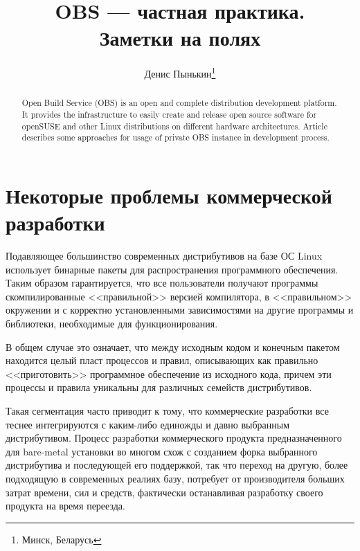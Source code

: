 \documentclass[10pt, a5paper]{article}
\begin{document}
\title{OBS --- частная практика.\\Заметки на полях}

\author{Денис Пынькин\footnote{Минск, Беларусь}}
\maketitle

\begin{abstract}
Open Build Service (OBS) is an open and complete distribution development platform. It provides the infrastructure to easily create and release open source software for openSUSE and other Linux distributions on different hardware architectures. Article describes some approaches for usage of private OBS instance in development process.
\end{abstract}

\section*{Некоторые проблемы коммерческой разработки}

Подавляющее большинство современных дистрибутивов на базе ОС Linux использует бинарные пакеты для распространения программного обеспечения. Таким образом гарантируется, что все пользователи получают программы скомпилированные <<правильной>> версией компилятора, в <<правильном>> окружении и с корректно установленными зависимостями на другие программы и библиотеки, необходимые для функционирования.

В общем случае это означает, что между исходным кодом и конечным пакетом находится целый пласт процессов и правил, описывающих как правильно <<приготовить>> программное обеспечение из исходного кода, причем эти процессы и правила уникальны для различных семейств дистрибутивов.

Такая сегментация часто приводит к тому, что коммерческие разработки все теснее интегрируются с каким-либо единожды и давно выбранным дистрибутивом. Процесс разработки коммерческого продукта предназначенного для bare-metal установки во многом схож с созданием форка выбранного дистрибутива и последующей его поддержкой, так что переход на другую, более подходящую в современных реалиях базу, потребует от производителя больших затрат времени, сил и средств, фактически останавливая разработку своего продукта на время переезда.
\end{document}
